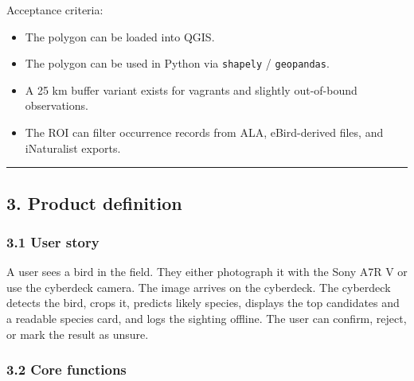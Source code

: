 \documentclass[
  11pt,
]{article}
\providecommand{\tightlist}{%
  \setlength{\itemsep}{0pt}\setlength{\parskip}{0pt}}
\begin{document}
Acceptance criteria:

\begin{itemize}
\tightlist
\item
  The polygon can be loaded into QGIS.
\item
  The polygon can be used in Python via \texttt{shapely} /
  \texttt{geopandas}.
\item
  A 25 km buffer variant exists for vagrants and slightly out-of-bound
  observations.
\item
  The ROI can filter occurrence records from ALA, eBird-derived files,
  and iNaturalist exports.
\end{itemize}

\begin{center}\rule{0.5\linewidth}{0.5pt}\end{center}

\subsection{3. Product definition}\label{product-definition}

\subsubsection{3.1 User story}\label{user-story}

A user sees a bird in the field. They either photograph it with the Sony
A7R V or use the cyberdeck camera. The image arrives on the cyberdeck.
The cyberdeck detects the bird, crops it, predicts likely species,
displays the top candidates and a readable species card, and logs the
sighting offline. The user can confirm, reject, or mark the result as
unsure.

\subsubsection{3.2 Core functions}\label{core-functions}
\end{document}
